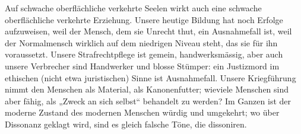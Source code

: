 Auf schwache oberflächliche verkehrte Seelen wirkt auch eine schwache oberflächliche verkehrte Erziehung. Unsere heutige Bildung hat noch Erfolge aufzuweisen, weil der Mensch, dem sie Unrecht thut, ein Ausnahmefall ist, weil der Normalmensch wirklich auf dem niedrigen Niveau steht, das sie für ihn voraussetzt. Unsere Strafrechtpflege ist gemein, handwerksmässig, aber auch unsere Verbrecher sind Handwerker und blosse Stümper: ein Justizmord im ethischen (nicht etwa juristischen) Sinne ist Ausnahmefall. Unsere Kriegführung nimmt den Menschen als Material, als Kanonenfutter; wieviele Menschen sind aber fähig, als „Zweck an sich selbst“ behandelt zu werden? Im Ganzen ist der moderne Zustand des modernen Menschen würdig und umgekehrt; wo über Dissonanz geklagt wird, sind es gleich  falsche Töne, die dissoniren.
\par

